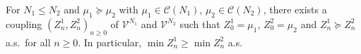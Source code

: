 \begin{corollary}
For $N_1\le N_2$ and $\mu_1\succcurlyeq\mu_2$ with $\mu_1\in\mathcal C(N_1)$, $\mu_2\in\mathcal C(N_2)$, there exists a coupling $(Z^1_n,Z^2_n)_{n\ge 0}$ of $\mathcal V^{N_1}$ and $\mathcal V^{N_2}$ such that $Z^1_0=\mu_1$, $Z^2_0=\mu_2$ and $Z^1_n\succcurlyeq Z^2_n$ a.s.\ for all $n\ge 0$. In particular, $\min Z^1_n\ge\min Z^2_n$ a.s.
\end{corollary}
